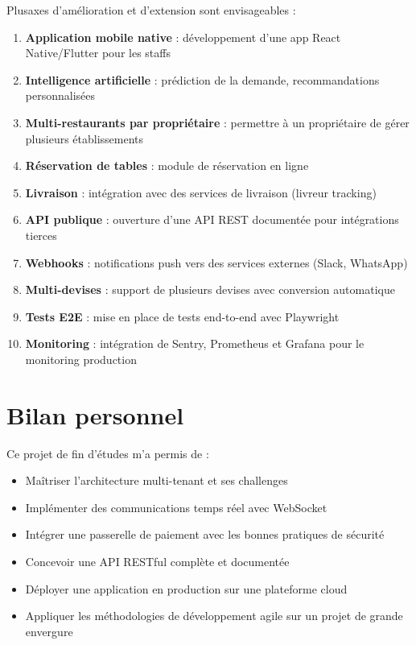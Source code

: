 \documentclass[12pt,a4paper]{report}
\begin{document}
Plusaxes d'amélioration et d'extension sont envisageables :

\begin{enumerate}
    \item \textbf{Application mobile native} : développement d'une app React Native/Flutter pour les staffs
    \item \textbf{Intelligence artificielle} : prédiction de la demande, recommandations personnalisées
    \item \textbf{Multi-restaurants par propriétaire} : permettre à un propriétaire de gérer plusieurs établissements
    \item \textbf{Réservation de tables} : module de réservation en ligne
    \item \textbf{Livraison} : intégration avec des services de livraison (livreur tracking)
    \item \textbf{API publique} : ouverture d'une API REST documentée pour intégrations tierces
    \item \textbf{Webhooks} : notifications push vers des services externes (Slack, WhatsApp)
    \item \textbf{Multi-devises} : support de plusieurs devises avec conversion automatique
    \item \textbf{Tests E2E} : mise en place de tests end-to-end avec Playwright
    \item \textbf{Monitoring} : intégration de Sentry, Prometheus et Grafana pour le monitoring production
\end{enumerate}

\section*{Bilan personnel}

Ce projet de fin d'études m'a permis de :
\begin{itemize}
    \item Maîtriser l'architecture multi-tenant et ses challenges
    \item Implémenter des communications temps réel avec WebSocket
    \item Intégrer une passerelle de paiement avec les bonnes pratiques de sécurité
    \item Concevoir une API RESTful complète et documentée
    \item Déployer une application en production sur une plateforme cloud
    \item Appliquer les méthodologies de développement agile sur un projet de grande envergure
\end{itemize}
\end{document}
